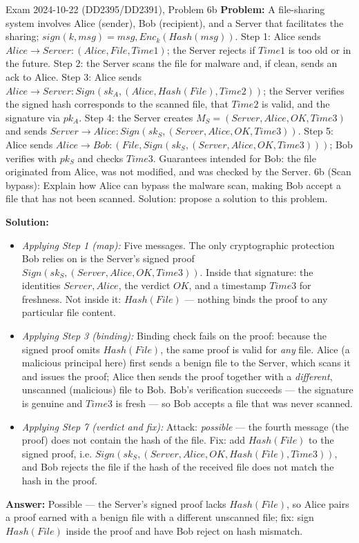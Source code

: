 \documentclass[12pt, a4paper]{article}
\begin{document}
\begin{practicebox}{Exam 2024-10-22 (DD2395/DD2391), Problem 6b}
\textbf{Problem:} A file-sharing system involves Alice (sender), Bob (recipient), and a Server that facilitates the sharing; $sign(k, msg) = msg, Enc_k(Hash(msg))$. Step 1: Alice sends $Alice \to Server : (Alice, File, Time1)$; the Server rejects if $Time1$ is too old or in the future. Step 2: the Server scans the file for malware and, if clean, sends an ack to Alice. Step 3: Alice sends $Alice \to Server : Sign(sk_A, (Alice, Hash(File), Time2))$; the Server verifies the signed hash corresponds to the scanned file, that $Time2$ is valid, and the signature via $pk_A$. Step 4: the Server creates $M_S = (Server, Alice, OK, Time3)$ and sends $Server \to Alice : Sign(sk_S, (Server, Alice, OK, Time3))$. Step 5: Alice sends $Alice \to Bob : (File, Sign(sk_S, (Server, Alice, OK, Time3)))$; Bob verifies with $pk_S$ and checks $Time3$. Guarantees intended for Bob: the file originated from Alice, was not modified, and was checked by the Server. 6b (Scan bypass): Explain how Alice can bypass the malware scan, making Bob accept a file that has not been scanned. Solution: propose a solution to this problem.

\textbf{Solution:}
\begin{itemize}
    \item \textit{Applying Step 1 (map):} Five messages. The only cryptographic protection Bob relies on is the Server's signed proof $Sign(sk_S, (Server, Alice, OK, Time3))$. Inside that signature: the identities $Server, Alice$, the verdict $OK$, and a timestamp $Time3$ for freshness. Not inside it: $Hash(File)$ --- nothing binds the proof to any particular file content.
    \item \textit{Applying Step 3 (binding):} Binding check fails on the proof: because the signed proof omits $Hash(File)$, the same proof is valid for \emph{any} file. Alice (a malicious principal here) first sends a benign file to the Server, which scans it and issues the proof; Alice then sends the proof together with a \emph{different}, unscanned (malicious) file to Bob. Bob's verification succeeds --- the signature is genuine and $Time3$ is fresh --- so Bob accepts a file that was never scanned.
    \item \textit{Applying Step 7 (verdict and fix):} Attack: \emph{possible} --- the fourth message (the proof) does not contain the hash of the file. Fix: add $Hash(File)$ to the signed proof, i.e. $Sign(sk_S, (Server, Alice, OK, Hash(File), Time3))$, and Bob rejects the file if the hash of the received file does not match the hash in the proof.
\end{itemize}
\textbf{Answer:} Possible --- the Server's signed proof lacks $Hash(File)$, so Alice pairs a proof earned with a benign file with a different unscanned file; fix: sign $Hash(File)$ inside the proof and have Bob reject on hash mismatch.
\end{practicebox}
\end{document}
